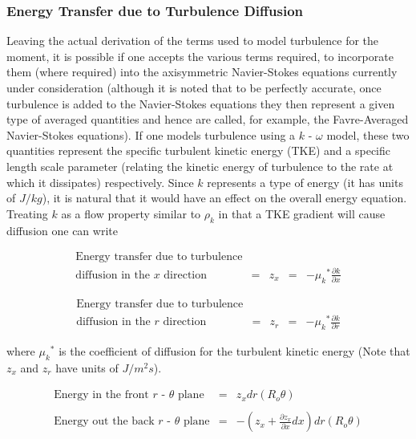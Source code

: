 \subsubsection{Energy Transfer due to Turbulence Diffusion}

	Leaving the actual derivation of the terms used to model turbulence for the moment, it is possible if one 
accepts the various terms required, to incorporate them (where required) into the axisymmetric Navier-Stokes equations
currently under consideration (although it is noted that to be perfectly accurate, once turbulence is added to the
Navier-Stokes equations they then represent a given type of averaged quantities and hence are called, for example, the
Favre-Averaged Navier-Stokes equations).  If one models turbulence using a $k$ - $\omega$ model, these two quantities 
represent the specific turbulent kinetic energy (TKE) and a specific length scale parameter (relating the kinetic energy of 
turbulence to the rate at which it dissipates) respectively.  Since $k$ represents a type of energy (it has units of 
$J/kg$), it is natural that it would have an effect on the overall energy equation.  Treating $k$ as a flow property similar 
to $\rho_k$ in that a TKE gradient will cause diffusion one can write 

\begin{equation}
	\begin{array}{ccccc}
		\textrm{Energy transfer due to turbulence}\\ \textrm{diffusion in the $x$ direction} & = &
		z_x & = & -{\mu _k}^* \frac{\partial k}{\partial x}
	\end{array}
\label{eqn:zx}
\end{equation}

\begin{equation}
	\begin{array}{ccccc}
		\textrm{Energy transfer due to turbulence}\\ \textrm{diffusion in the $r$ direction} & = &
		z_r & = & -{\mu _k}^* \frac{\partial k}{\partial r}
	\end{array}
\label{eqn:zr}
\end{equation}

	where ${\mu_k}^*$ is the coefficient of diffusion for the turbulent kinetic energy (Note that $z_x$ and $z_r$ 
have units of $J/m^2 s$).  

\begin{displaymath}
	\begin{array}{ccc}
		\textrm{Energy in the front $r$ - $\theta$ plane} & = & z_xdr(R_o \theta) 
		\\ & & \\
		\textrm{Energy out the back $r$ - $\theta$ plane} & = & -(z_x + 
		\frac{\partial z_x}{\partial x}dx)dr(R_o \theta)
	\end{array}
\end{displaymath}

